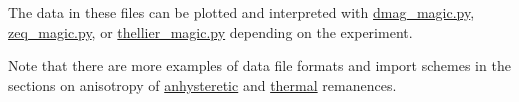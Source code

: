 \documentclass[11pt]{book}
\begin{document}
{{\begin{verbatim}
 \end{verbatim}

The data in these files can be plotted and interpreted with \href{#dmag_magic.py}{dmag\_magic.py}, \href{#zeq_magic.py}{zeq\_magic.py}, or \href{#thellier_magic.py}{ thellier\_magic.py}  depending on the experiment.  

Note that there are more examples of data file formats and import schemes in the sections on anisotropy of \href{#aarm_magic.py}{anhysteretic}  and \href{#atrm_magic.py}{thermal} remanences.


%




}}
\end{document}
